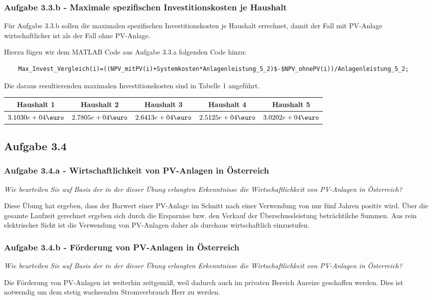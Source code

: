 \documentclass[a4paper,12pt]{article}
\begin{document}
	\subsubsection{Aufgabe 3.3.b - Maximale spezifischen Investitionskosten je Haushalt}
	Für Aufgabe 3.3.b sollen die maximalen spezifischen Investitionskosten je Haushalt errechnet, damit der Fall mit PV-Anlage wirtschaftlicher ist als der Fall ohne PV-Anlage.\\ \par
	\noindent Hierzu fügen wir dem MATLAB Code aus Aufgabe 3.3.a folgenden Code hinzu:
	\begin{lstlisting}
	Max_Invest_Vergleich(i)=((NPV_mitPV(i)+Systemkosten*Anlagenleistung_5_2)$-$NPV_ohnePV(i))/Anlagenleistung_5_2;
	\end{lstlisting}
	Die daraus resultierenden maximalen Investitionskosten sind in Tabelle 1 angeführt.
	\begin{table}[H]
		\centering
		\begin{tabular}{|c|c|c|c|c|}
			\hline
			Haushalt 1   & Haushalt 2   & Haushalt 3   & Haushalt 4   & Haushalt 5   \\ \hline
			$3.1030e+04\mbox{\euro}$ & $2.7805e+04\mbox{\euro}$ & $2.6413e+04\mbox{\euro}$ & $2.5125e+04\mbox{\euro}$ & $3.0202e+04\mbox{\euro}$ \\ \hline
		\end{tabular}
	\end{table}
	\subsection{Aufgabe 3.4}
	\subsubsection{Aufgabe 3.4.a - Wirtschaftlichkeit von PV-Anlagen in Österreich}
	\textit{Wie beurteilen Sie auf Basis der in der dieser Übung erlangten Erkenntnisse die Wirtschaftlichkeit von PV-Anlagen in Österreich?}\\ \par
	\noindent Diese Übung hat ergeben, dass der Barwert einer PV-Anlage im Schnitt nach einer Verwendung von nur fünf Jahren positiv wird. Über die gesamte Laufzeit gerechnet ergeben sich durch die Ersparnise bzw. den Verkauf der Überschussleistung beträchtilche Summen. Aus rein elektrischer Sicht ist die Verwendung von PV-Anlagen daher als durchaus wirtschaftlich einzustufen.
	\subsubsection{Aufgabe 3.4.b - Förderung von PV-Anlagen in Österreich}
	\textit{Wie beurteilen Sie auf Basis der in der dieser Übung erlangten Erkenntnisse die Wirtschaftlichkeit von PV-Anlagen in Österreich?}\\ \par
	\noindent Die Förderung von PV-Anlagen ist weiterhin zeitgemäß, weil dadurch auch im privaten Bereich Anreize geschaffen werden. Dies ist notwendig um dem stetig wachsenden Stromverbrauch Herr zu werden.
	\newpage
	\listoffigures
\end{document}
